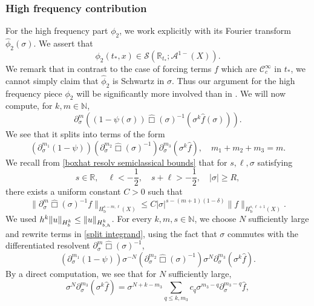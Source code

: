 \documentclass[10pt,a4paper,reqno]{amsart}
\newcommand{\CI}{\mathcal{C}^\infty}
\newcommand{\RR}{\mathbb{R}}
\newcommand{\NN}{\mathbb{N}}
\newcommand{\A}{\mathcal{A}}
\newcommand{\Hb}{H_\text{b}}
\newcommand{\pa}{\partial}
\let\hat\widehat
\theoremstyle{definition}
\theoremstyle{remark}
\numberwithin{equation}{section}
\newcommand{\wh}{\widehat}
\begin{document}
\subsubsection{High frequency contribution} 
\label{subsubsection:high frequency}
For the high frequency part $\phi_2$, we work explicitly with its Fourier transform $\hat\phi_2(\sigma)$.
We assert that
\begin{equation}
\label{phi2 rapid decay}
    \phi_2(t_*,x) \in \mathscr{S}(\mathbb{R}_{t_*};\A^{1-}(X)).
\end{equation}
We remark that in contrast to the case of forcing terms $f$ which are $\CI_c$ in $t_*$, we cannot simply claim that $\hat\phi_2$ is Schwartz in $\sigma$. Thus our argument for the high frequency piece $\phi_2$ will be significantly more involved than in \cite{Hin22}.
We will now compute, for $k,m\in\mathbb{N}$,
\[
	\pa_\sigma^m ((1-\psi(\sigma))\wh\Box(\sigma)^{-1}(\sigma^k\wh{f}(\sigma))).
\]
We see that it splits into terms of the form
\begin{equation}
\label{split integrand}
   (\partial_\sigma^{m_1}(1-\psi))(\partial_\sigma^{m_2} \wh\Box(\sigma)^{-1}) \pa_\sigma^{m_3} (\sigma^k\wh{f}),\quad m_1+m_2+m_3 = m.
\end{equation}
We recall from \eqref{boxhat resolv semiclassical bounds} that for $s,\ell,\sigma$ satisfying
\begin{equation}
	\label{eqn:s,ell,sigma}
	s\in\RR,\quad \ell<-\frac{1}{2},\quad s+\ell>-\frac{1}{2},\quad |\sigma|\geq R,
\end{equation} 
there exists a uniform constant $C>0$ such that
\begin{equation}
\label{deriv resolvent bounds}
    \|\partial_\sigma^m \wh\Box(\sigma)^{-1} f\|_{\Hb^{s-m,\ell}(X)} \leq C|\sigma|^{s-(m+1)(1-\delta)} \|f\|_{\Hb^{s,\ell+1}(X)}.
\end{equation}
We used $h^k \|u\|_{H^k_{\rm b}} \le \|u\|_{H^k_{{\rm b}, h}}$.
For every $k,m,s\in\NN$, we choose $N$ sufficiently large and rewrite terms in \eqref{split integrand}, using the fact that $\sigma$ commutes with the differentiated resolvent $\partial_\sigma^m \wh\Box(\sigma)^{-1}$, 
\begin{equation}
\label{split integrand 2}
    (\partial_\sigma^{m_1}(1-\psi))\sigma^{-N}(\partial_\sigma^{m_2} \wh\Box(\sigma)^{-1}) \sigma^{N}\pa_\sigma^{m_3} (\sigma^k \wh{f}).
\end{equation}
By a direct computation, we see that for $N$ sufficiently large,
\[
	\sigma^{N}\pa_\sigma^{m_3} (\sigma^k \wh{f}) = \sigma^{N+k-m_3} \sum_{q\leq k,m_3} c_q \sigma^{m_3-q} \pa_\sigma^{m_3-q} \wh{f},
\]
\end{document}
